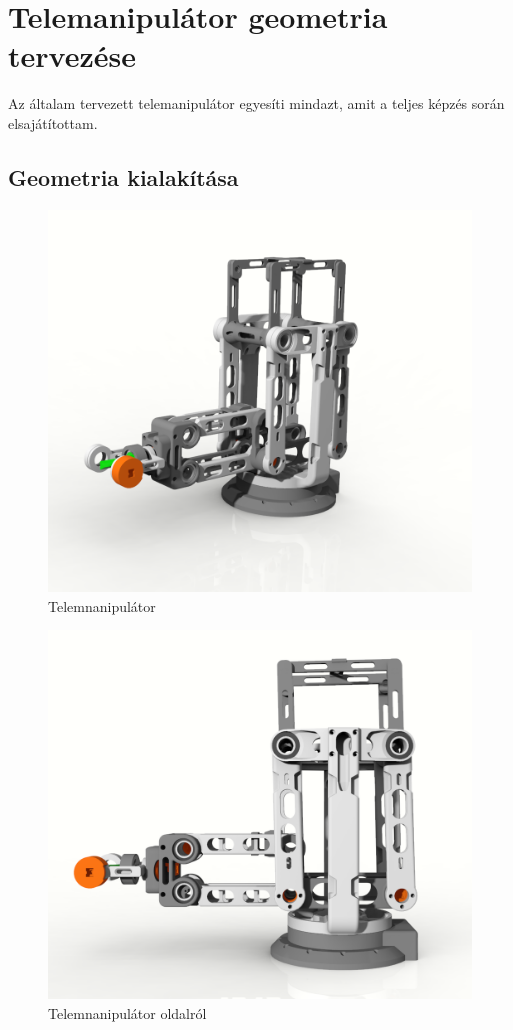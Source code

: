 \chapter{Telemanipulátor geometria tervezése}
\label{sec:LatexTools}

Az általam tervezett telemanipulátor egyesíti mindazt, amit a teljes képzés során elsajátítottam. 

\section{Geometria kialakítása}

\begin{figure}[!ht]
\centering
\includegraphics[width=120mm, keepaspectratio]{figures/Diploma_CAD/creo1.png}
\caption{Telemnanipulátor}
\label{fig:Telemnanipulátor}
\end{figure}

\begin{figure}[!ht]
\centering
\includegraphics[width=120mm, keepaspectratio]{figures/Diploma_CAD/creo2.png}
\caption{Telemnanipulátor oldalról}
\label{fig:Telemnanipulátor}
\end{figure}


